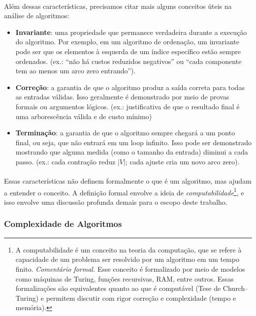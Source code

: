 \documentclass[12pt,a4paper]{article}
\begin{document}
\paragraph{}
Além dessas características, precisamos citar mais alguns conceitos úteis na análise de algoritmos:
\begin{itemize}\setlength{\itemsep}{2pt}
    \item \textbf{Invariante}: uma propriedade que permanece verdadeira durante a execução do algoritmo. Por exemplo, em um algoritmo de ordenação, um invariante pode ser que os elementos à esquerda de um índice específico estão sempre ordenados. (ex.: “não há custos reduzidos negativos” ou “cada componente tem ao menos um arco zero entrando”).
    \item \textbf{Correção}: a garantia de que o algoritmo produz a saída correta para todas as entradas válidas. Isso geralmente é demonstrado por meio de provas formais ou argumentos lógicos. (ex.: justificativa de que o resultado final é uma arborescência válida e de custo mínimo)
    \item \textbf{Terminação}: a garantia de que o algoritmo sempre chegará a um ponto final, ou seja, que não entrará em um loop infinito. Isso pode ser demonstrado mostrando que alguma medida (como o tamanho da entrada) diminui a cada passo. (ex.: cada contração reduz $|V|$; cada ajuste cria um novo arco zero).
\end{itemize}

\paragraph{}
Essas características não definem formalmente o que é um algoritmo, mas ajudam a entender o conceito. A definição formal envolve a ideia de \emph{computabilidade}\footnote{A computabilidade é um conceito na teoria da computação, que se refere à capacidade de um problema ser resolvido por um algoritmo em um tempo finito. \emph{Comentário formal.} Esse conceito é formalizado por meio de modelos como máquinas de Turing, funções recursivas, RAM, entre outros. Essas formalizações são equivalentes quanto ao que é computável (Tese de Church–Turing) e permitem discutir com rigor correção e complexidade (tempo e memória).}, e isso envolve uma discussão profunda demais para o escopo deste trabalho.

\subsubsection{Complexidade de Algoritmos}
\end{document}
